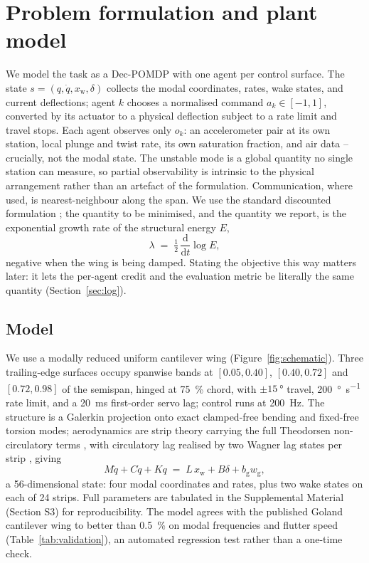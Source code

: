 \documentclass[preprint,11pt]{elsarticle}
\begin{document}
\section{Problem formulation and plant model}
\label{sec:problem}

We model the task as a Dec-POMDP
\cite{bernstein2002complexity,oliehoek2016concise} with one agent per
control surface. The state $s=(q,\dot q,x_{\mathrm{w}},\delta)$ collects the
modal coordinates, rates, wake states, and current deflections; agent $k$
chooses a normalised command $a_k\in[-1,1]$, converted by its actuator to a
physical deflection subject to a rate limit and travel stops. Each agent
observes only $o_k$: an accelerometer pair at its own station, local plunge
and twist rate, its own saturation fraction, and air data -- crucially, not
the modal state. The unstable mode is a global quantity no single station
can measure, so partial observability is intrinsic to the physical
arrangement rather than an artefact of the formulation. Communication,
where used, is nearest-neighbour along the span. We use the standard
discounted formulation \cite{sutton2018reinforcement}; the quantity to be
minimised, and the quantity we report, is the exponential growth rate of
the structural energy $E$,
\begin{equation}
\lambda \;=\; \tfrac{1}{2}\,\frac{\mathrm{d}}{\mathrm{d}t}\log E ,
\label{eq:objective}
\end{equation}
negative when the wing is being damped. Stating the objective this way
matters later: it lets the per-agent credit and the evaluation metric be
literally the same quantity (Section~\ref{sec:log}).

\subsection{Model}
\label{sec:plant}

We use a modally reduced uniform cantilever wing (Figure~\ref{fig:schematic}).
Three trailing-edge surfaces occupy spanwise bands at
$[0.05,0.40]$, $[0.40,0.72]$ and $[0.72,0.98]$ of the semispan, hinged at
\SI{75}{\percent} chord, with $\pm\SI{15}{\degree}$ travel,
\SI{200}{\degree\per\second} rate limit, and a \SI{20}{\milli\second}
first-order servo lag; control runs at \SI{200}{\hertz}. The structure is a
Galerkin projection onto exact clamped-free bending and fixed-free torsion
modes; aerodynamics are strip theory carrying the full Theodorsen
non-circulatory terms \cite{theodorsen1935}, with circulatory lag realised
by two Wagner lag states per strip \cite{jones1940}, giving
\begin{equation}
M \ddot q + C \dot q + K q \;=\; L\, x_{\mathrm{w}} + B \delta
+ b_{\mathrm{g}} w_{\mathrm{g}} ,
\label{eq:eom}
\end{equation}
a 56-dimensional state: four modal coordinates and rates, plus two wake
states on each of 24 strips. Full parameters are tabulated in the
Supplemental Material (Section S3) for reproducibility. The model agrees
with the published Goland cantilever wing \cite{goland1945} to better than
\SI{0.5}{\percent} on modal frequencies and flutter speed
(Table~\ref{tab:validation}), an automated regression test rather than a
one-time check.
\end{document}
